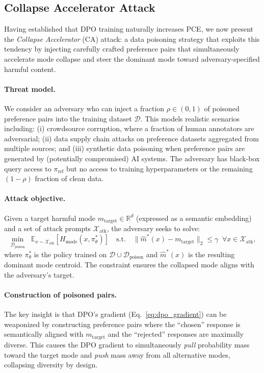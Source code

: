 \subsection{Collapse Accelerator Attack}
\label{sec:attack}
\label{sec:collapse_attack}

Having established that DPO training naturally increases PCE, we now present the \emph{Collapse Accelerator} (CA) attack: a data poisoning strategy that exploits this tendency by injecting carefully crafted preference pairs that simultaneously accelerate mode collapse and steer the dominant mode toward adversary-specified harmful content.

\paragraph{Threat model.} We consider an adversary who can inject a fraction $\rho \in (0, 1)$ of poisoned preference pairs into the training dataset $\mathcal{D}$. This models realistic scenarios including: (i) crowdsource corruption, where a fraction of human annotators are adversarial; (ii) data supply chain attacks on preference datasets aggregated from multiple sources; and (iii) synthetic data poisoning when preference pairs are generated by (potentially compromised) AI systems. The adversary has black-box query access to $\pi_{\text{ref}}$ but no access to training hyperparameters or the remaining $(1-\rho)$ fraction of clean data.

\paragraph{Attack objective.} Given a target harmful mode $m_{\text{target}} \in \mathbb{R}^d$ (expressed as a semantic embedding) and a set of attack prompts $\mathcal{X}_{\text{atk}}$, the adversary seeks to solve:
\begin{equation}
\label{eq:attack_obj}
\min_{\mathcal{D}_{\text{poison}}} \;\; \mathbb{E}_{x \sim \mathcal{X}_{\text{atk}}}\!\left[H_{\text{mode}}(x, \pi_\theta^*)\right] \quad \text{s.t.} \quad \|\hat{m}^*(x) - m_{\text{target}}\|_2 \leq \gamma \;\; \forall x \in \mathcal{X}_{\text{atk}},
\end{equation}
where $\pi_\theta^*$ is the policy trained on $\mathcal{D} \cup \mathcal{D}_{\text{poison}}$ and $\hat{m}^*(x)$ is the resulting dominant mode centroid. The constraint ensures the collapsed mode aligns with the adversary's target.

\paragraph{Construction of poisoned pairs.} The key insight is that DPO's gradient (Eq.~\ref{eq:dpo_gradient}) can be weaponized by constructing preference pairs where the ``chosen'' response is semantically aligned with $m_{\text{target}}$ and the ``rejected'' responses are maximally diverse. This causes the DPO gradient to simultaneously \emph{pull} probability mass toward the target mode and \emph{push} mass away from all alternative modes, collapsing diversity by design.

